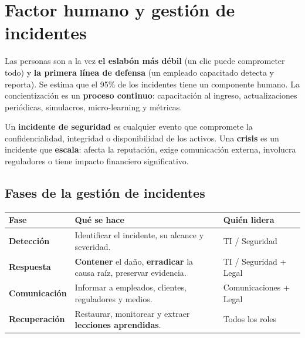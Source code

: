 \documentclass[12pt,a4paper]{article}
\begin{document}
\section{Factor humano y gesti\'on de incidentes}

Las personas son a la vez \textbf{el eslab\'on m\'as d\'ebil} (un clic puede
comprometer todo) y \textbf{la primera l\'inea de defensa} (un empleado capacitado
detecta y reporta). Se estima que el 95\% de los incidentes tiene un componente
humano. La concientizaci\'on es un \textbf{proceso continuo}: capacitaci\'on al
ingreso, actualizaciones peri\'odicas, simulacros, micro-learning y m\'etricas.

\begin{cajaDefinicion}
Un \textbf{incidente de seguridad} es cualquier evento que compromete la
confidencialidad, integridad o disponibilidad de los activos. Una \textbf{crisis} es
un incidente que \textbf{escala}: afecta la reputaci\'on, exige comunicaci\'on
externa, involucra reguladores o tiene impacto financiero significativo.
\end{cajaDefinicion}

\subsection{Fases de la gesti\'on de incidentes}
\begin{tabularx}{\textwidth}{|>{\bfseries}p{2.9cm}|X|>{\raggedright\arraybackslash}p{3.6cm}|}
\hline
\rowcolor{grisClaro}
Fase & Qu\'e se hace & Qui\'en lidera \\
\hline
Detecci\'on & Identificar el incidente, su alcance y severidad. & TI / Seguridad \\
\hline
Respuesta & \textbf{Contener} el da\~no, \textbf{erradicar} la causa ra\'iz, preservar evidencia. & TI / Seguridad + Legal \\
\hline
Comunicaci\'on & Informar a empleados, clientes, reguladores y medios. & Comunicaciones + Legal \\
\hline
Recuperaci\'on & Restaurar, monitorear y extraer \textbf{lecciones aprendidas}. & Todos los roles \\
\hline
\end{tabularx}
\end{document}
